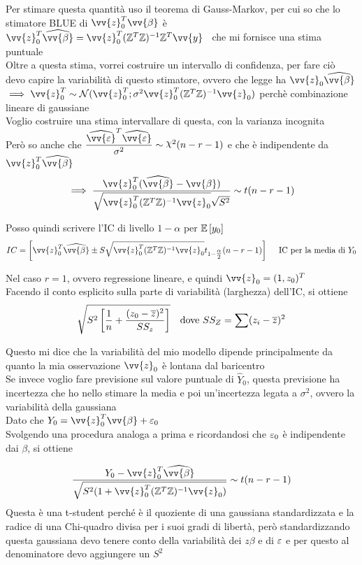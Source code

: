 Per stimare questa quantità uso il teorema di Gauss-Markov, per cui so che lo stimatore BLUE di $\vv{z}_0^T\vv{\beta}$ è $\vv{z}_0^T\hat{\vv{\beta}} = \vv{z}_0^T(\ZZ^T\ZZ)^{-1}\ZZ^T\vv{y}$ \ che mi fornisce una stima puntuale\\
Oltre a questa stima, vorrei costruire un intervallo di confidenza, per fare ciò devo capire la variabilità di questo stimatore, ovvero che legge ha $\vv{z}_0\hat{\vv{\beta}}$\\

$\implies \vv{z}_0^T \sim \Nc (\vv{z}_0^T; \sigma^2 \vv{z}_0^T (\ZZ^T\ZZ)^{-1}\vv{z}_0)$ perchè combinazione lineare di gaussiane\\
Voglio costruire una stima intervallare di questa, con la varianza incognita\\
Però so anche che $\frac{\hat{\vv{\eps}}^T\hat{\vv{\eps}}}{\sigma^2}\sim \Chi^2(n-r-1)$ e che è indipendente da $\vv{z}_0^T \hat{\vv{\beta}}$\\

\[
\implies \frac{\vv{z}_0^T (\hat{\vv{\beta}}-\vv{\beta})}{\sqrt{\vv{z}_0^T(\ZZ^T\ZZ)^{-1}\vv{z}_0}\sqrt{S^2}}\sim t(n-r-1)
\]

Posso quindi scrivere l'IC di livello $1-\alpha$ per $\mathbb{E} \left[ y_0 \right]$
\[
IC=\OO \vv{z}_0^T \hat{\vv{\beta}} \pm S \sqrt{\vv{z}_0^T(\ZZ^T\ZZ)^{-1}\vv{z}_0} t_{1-\tfrac{\alpha}{2}}(n-r-1) \CC \ \ \ \text{ IC per la media di } Y_0
\]


Nel caso $r=1$, ovvero regressione lineare, e quindi $\vv{z}_0=(1,z_0)^T$\\
Facendo il conto esplicito sulla parte di variabilità (larghezza) dell'IC, si ottiene
\[
\sqrt{S^2 \left[\dfrac{1}{n} + \dfrac{(z_0-\overline{z})^2}{SS_z} \right]} \ \ \text{ dove } SS_Z=\sum (z_i-\overline{z})^2
\]

Questo mi dice che la variabilità del mio modello dipende principalmente da quanto la mia osservazione $\vv{z}_0$ è lontana dal baricentro\\


Se invece voglio fare previsione sul valore puntuale di $\hat{Y}_0$, questa previsione ha incertezza che ho nello stimare la media e poi un'incertezza legata a $\sigma^2$, ovvero la variabilità della gaussiana\\


Dato che $Y_0 = \vv{z}_0^T\vv{\beta} + \eps_0$\\
Svolgendo una procedura analoga a prima e ricordandosi che $\varepsilon_0$ è indipendente dai $\beta$, si ottiene

\[
\frac{Y_0 - \vv{z}_0^T\hat{\vv{\beta}}}{\sqrt{S^2(1+\vv{z}_0^T(\ZZ^T\ZZ)^{-1}\vv{z}_0)}}\sim t(n-r-1)
\]
Questa è una t-student perché è il quoziente di una gaussiana standardizzata e la radice di una Chi-quadro divisa per i suoi gradi di libertà, però standardizzando questa gaussiana devo tenere conto della variabilità dei $z\beta$ e di $\varepsilon$ e per questo al denominatore devo aggiungere un $S^2$\\

